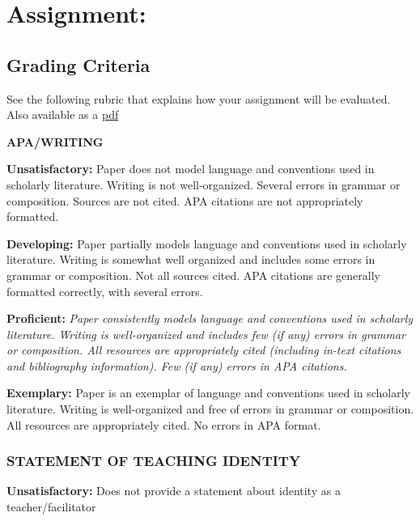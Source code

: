\documentclass[
]{book}
\begin{document}
\hypertarget{assignment}{%
\section*{Assignment:}\label{assignment}}

\hypertarget{grading-criteria}{%
\subsection*{Grading Criteria}\label{grading-criteria}}

See the following rubric that explains how your assignment will be evaluated. Also available as a \href{assets/assessment/Identity-as-a-Teacher-RUBRIC.pdf}{pdf}

\textbf{APA/WRITING}

\textbf{Unsatisfactory:} Paper does not model language and conventions used in scholarly literature. Writing is not well-organized. Several errors in grammar or composition. Sources are not cited. APA citations are not appropriately formatted.

\textbf{Developing:} Paper partially models language and conventions used in scholarly literature. Writing is somewhat well organized and includes some errors in grammar or composition. Not all sources cited. APA citations are generally formatted correctly, with several errors.

\textbf{Proficient:} \emph{Paper consistently models language and conventions used in scholarly literature. Writing is well-organized and includes few (if any) errors in grammar or composition. All resources are appropriately cited (including in-text citations and bibliography information). Few (if any) errors in APA citations.}

\textbf{Exemplary:} Paper is an exemplar of language and conventions used in scholarly literature. Writing is well-organized and free of errors in grammar or composition. All resources are appropriately cited. No errors in APA format.

\hypertarget{statement-of-teaching-identity}{%
\subsubsection*{STATEMENT OF TEACHING IDENTITY}\label{statement-of-teaching-identity}}

\textbf{Unsatisfactory:} Does not provide a statement about identity as a teacher/facilitator
\end{document}
